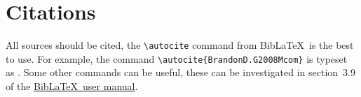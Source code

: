 \documentclass[twoside,10pt,a4paper]{article}
\numberwithin{equation}{section}					%
\numberwithin{figure}{section}						%
\begin{document}
\section{Citations}\label{sec:citations}
All sources should be cited, the \verb|\autocite| command from Bib\LaTeX\ is the best to use. For example, the command \verb|\autocite{BrandonD.G2008Mcom}| is typeset as \autocite{BrandonD.G2008Mcom}. Some other commands can be useful, these can be investigated in section~3.9 of the \href{http://mirror.ox.ac.uk/sites/ctan.org/macros/latex/contrib/biblatex/doc/biblatex.pdf}{Bib\LaTeX\ user manual}.


\printbibliography			%
\end{document}
